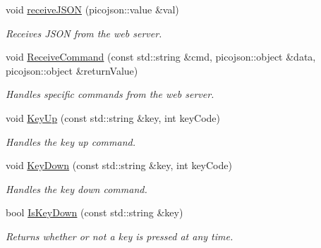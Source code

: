 \begin{DoxyCompactItemize}
\mbox{\label{classWebApp_a0af5cfc12444f53e48609360eff95d76}} 
void \hyperlink{classWebApp_a0af5cfc12444f53e48609360eff95d76}{receive\+J\+S\+ON} (picojson\+::value \&val)
\begin{DoxyCompactList}\small\item\em Receives J\+S\+ON from the web server. \end{DoxyCompactList}\item 
\mbox{\label{classWebApp_ac1ae360aa44aeb9f2bccb53f6d7881b4}} 
void \hyperlink{classWebApp_ac1ae360aa44aeb9f2bccb53f6d7881b4}{Receive\+Command} (const std\+::string \&cmd, picojson\+::object \&data, picojson\+::object \&return\+Value)
\begin{DoxyCompactList}\small\item\em Handles specific commands from the web server. \end{DoxyCompactList}\item 
\mbox{\label{classWebApp_ae3ec2b1cf48fa4c1fd4dbd4b5b6ab1ab}} 
void \hyperlink{classWebApp_ae3ec2b1cf48fa4c1fd4dbd4b5b6ab1ab}{Key\+Up} (const std\+::string \&key, int key\+Code)
\begin{DoxyCompactList}\small\item\em Handles the key up command. \end{DoxyCompactList}\item 
\mbox{\label{classWebApp_a5ecf621134026359cdbae31480ceb204}} 
void \hyperlink{classWebApp_a5ecf621134026359cdbae31480ceb204}{Key\+Down} (const std\+::string \&key, int key\+Code)
\begin{DoxyCompactList}\small\item\em Handles the key down command. \end{DoxyCompactList}\item 
\mbox{\label{classWebApp_ada30b3adf08a8f51d113972e7d2d6ee6}} 
bool \hyperlink{classWebApp_ada30b3adf08a8f51d113972e7d2d6ee6}{Is\+Key\+Down} (const std\+::string \&key)
\begin{DoxyCompactList}\small\item\em Returns whether or not a key is pressed at any time. \end{DoxyCompactList}\item 
\mbox{\label{classWebApp_a967d783a9f1be56fef662eee01b6e93a}} 

\end{DoxyCompactItemize}

